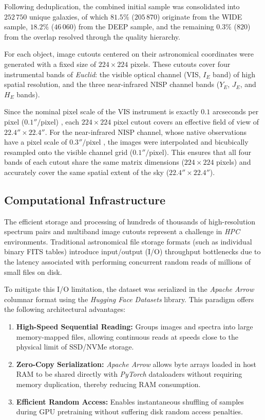 Following deduplication, the combined initial sample was consolidated into $252\,750$ unique galaxies, of which $81.5\%$ ($205\,870$) originate from the WIDE sample, $18.2\%$ ($46\,060$) from the DEEP sample, and the remaining $0.3\%$ ($820$) from the overlap resolved through the quality hierarchy.

For each object, image cutouts centered on their astronomical coordinates were generated with a fixed size of $224 \times 224$ pixels. These cutouts cover four instrumental bands of \textit{Euclid}: the visible optical channel (VIS, $I_E$ band) of high spatial resolution, and the three near-infrared NISP channel bands ($Y_E$, $J_E$, and $H_E$ bands).

Since the nominal pixel scale of the VIS instrument is exactly $0.1$ arcseconds per pixel ($0.1''/\text{pixel}$) \autocite{ar:cropper-2024}, each $224 \times 224$ pixel cutout covers an effective field of view of $22.4'' \times 22.4''$. For the near-infrared NISP channel, whose native observations have a pixel scale of $0.3''/\text{pixel}$ \autocite{ar:jahnke-2025}, the images were interpolated and bicubically resampled onto the visible channel grid ($0.1''/\text{pixel}$). This ensures that all four bands of each cutout share the same matrix dimensions ($224 \times 224$ pixels) and accurately cover the same spatial extent of the sky ($22.4'' \times 22.4''$).

\subsection{Computational Infrastructure}

The efficient storage and processing of hundreds of thousands of high-resolution spectrum pairs and multiband image cutouts represent a challenge in \textit{\gls{HPC}} environments. Traditional astronomical file storage formats (such as individual binary FITS tables) introduce input/output (I/O) throughput bottlenecks due to the latency associated with performing concurrent random reads of millions of small files on disk.

To mitigate this I/O limitation, the dataset was serialized in the \textit{Apache Arrow} columnar format using the \textit{Hugging Face Datasets} library. This paradigm offers the following architectural advantages:

\begin{enumerate}
\item \textbf{High-Speed Sequential Reading:} Groups images and spectra into large memory-mapped files, allowing continuous reads at speeds close to the physical limit of SSD/NVMe storage.
\item \textbf{Zero-Copy Serialization:} \textit{Apache Arrow} allows byte arrays loaded in host RAM to be shared directly with \textit{PyTorch} dataloaders without requiring memory duplication, thereby reducing RAM consumption.
\item \textbf{Efficient Random Access:} Enables instantaneous shuffling of samples during GPU pretraining without suffering disk random access penalties.
\end{enumerate}

